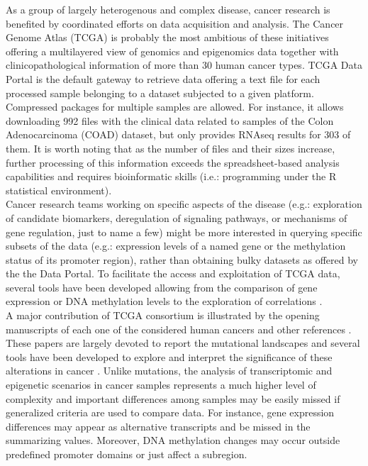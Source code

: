 \documentclass{bmcart}
\begin{document}
As a group of largely heterogenous and complex disease, cancer research is benefited by coordinated efforts on data acquisition and analysis. The Cancer Genome Atlas (TCGA) \cite{zhang2011international} is probably the most ambitious of these initiatives offering a multilayered view of genomics and epigenomics data together with clinicopathological information of more than 30 human cancer types. TCGA Data Portal \cite{tcgaportalweb} is the default gateway to retrieve data offering a text file for each processed sample belonging to a dataset subjected to a given platform. Compressed packages for multiple samples are allowed. For instance, it allows downloading 992 files with the clinical data related to samples of the Colon Adenocarcinoma (COAD) dataset, but only provides RNAseq results for 303 of them. It is worth noting that as the number of files and their sizes increase, further processing of this information exceeds the spreadsheet-based analysis capabilities and requires bioinformatic skills (i.e.: programming under the R statistical environment).\\

Cancer research teams working on specific aspects of the disease (e.g.: exploration of candidate biomarkers, deregulation of signaling pathways, or mechanisms of gene regulation, just to name a few) might be more interested in querying specific subsets of the data (e.g.: expression levels of a named gene or the methylation status of its promoter region), rather than obtaining bulky datasets as offered by the the Data Portal. To facilitate the access and exploitation of TCGA data, several tools have been developed allowing from the comparison of gene expression or DNA methylation levels to the exploration of correlations \cite{plass2013mutations,schroeder2013visualizing}.\\


A major contribution of TCGA consortium is illustrated by the opening manuscripts of each one of the considered human cancers \cite{weinstein2013cancer} and other references \cite{tcganetworkweb}. These papers are largely devoted to report the mutational landscapes and several tools have been developed to explore and interpret the significance of these alterations in cancer \cite{international2013computational}. Unlike mutations, the analysis of transcriptomic and epigenetic scenarios in cancer samples represents a much higher level of complexity and important differences among samples may be easily missed if generalized criteria are used to compare data. For instance, gene expression differences may appear as alternative transcripts and be missed in the summarizing values. Moreover, DNA methylation changes may occur outside predefined promoter domains or just affect a subregion.\\ 
\end{document}
